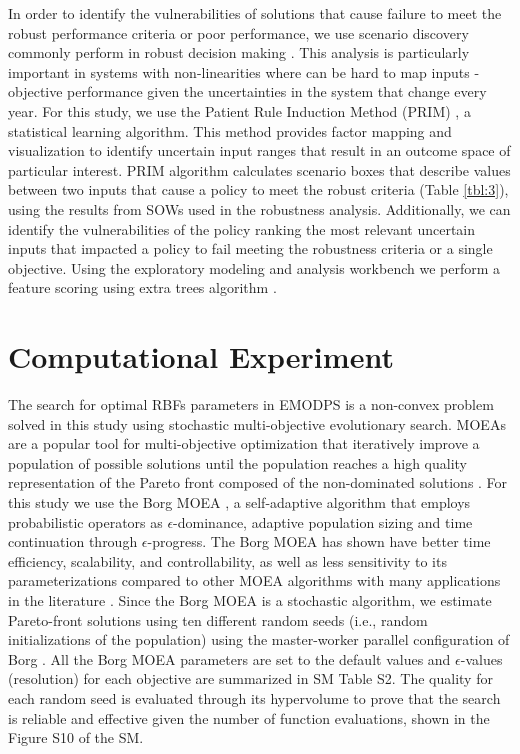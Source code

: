 \documentclass[a4paper,fleqn]{cas-sc}
\begin{document}
In order to identify the vulnerabilities of solutions that cause failure to meet the robust performance criteria or poor performance, we use scenario discovery commonly perform in robust decision making \citep{kasprzyk_many_2013,lempert_identifying_2010}. This analysis is particularly important in systems with non-linearities where can be hard to map inputs - objective performance given the uncertainties in the system that change every year. For this study, we use the Patient Rule Induction Method (PRIM) \citep{friedman_bump_1999,kwa}, a statistical learning algorithm. This method provides factor mapping and visualization to identify uncertain input ranges that result in an outcome space of particular interest. PRIM algorithm calculates scenario boxes that describe values between two inputs that cause a policy to meet the robust criteria (Table \ref{tbl:3}), using the results from SOWs used in the robustness analysis. Additionally, we can identify the vulnerabilities of the policy ranking the most relevant uncertain inputs that impacted a policy to fail meeting the robustness criteria or a single objective. Using the exploratory modeling and analysis workbench \citep{kwakkel_exploratory_2017} we perform a feature scoring using extra trees algorithm \citep{geurts_extremely_2006}. 

\section{Computational Experiment}

The search for optimal RBFs parameters in EMODPS is a non-convex problem \citep{giuliani_curses_2016} solved in this study using stochastic multi-objective evolutionary search. MOEAs are a popular tool for multi-objective optimization that iteratively improve a population of possible solutions  until the population reaches a high quality representation of the Pareto front composed of the non-dominated solutions \citep{coello_evolutionary_2007}.  For this study we use the Borg MOEA \citep{hadka_borg_2013}, a self-adaptive algorithm that employs probabilistic operators as $\epsilon$-dominance, adaptive population sizing and time continuation through $\epsilon$-progress. The Borg MOEA has shown have better time efficiency, scalability, and controllability, as well as less sensitivity to its parameterizations compared to other MOEA algorithms with many applications in the literature \citep{reed_evolutionary_2013,gupta_can_2020,zatarain_salazar_balancing_2017,seyedashraf_assisting_2023,al-jawad_reservoir_2017}. Since the Borg MOEA is a stochastic algorithm, we estimate Pareto-front solutions using ten different random seeds (i.e., random initializations of the population) using the master-worker parallel configuration of Borg \citep{hadka_large-scale_2015}. All the Borg MOEA parameters are set to the default values \citep{hadka_borg_2013} and $\epsilon$-values (resolution) for each objective are summarized in SM Table S2. The quality for each random seed is evaluated through its hypervolume \citep{hadka_diagnostic_2012} to prove that the search is reliable and effective given the number of function evaluations, shown in the Figure S10 of the SM.
\end{document}
